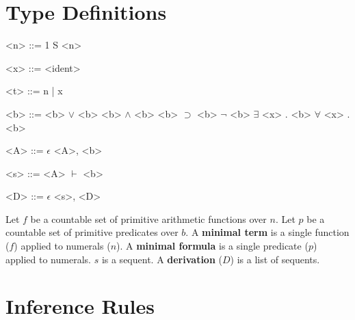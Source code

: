 \documentclass[11pt]{article}
\begin{document}
\section{Type Definitions}

\begin{grammar}
  <n> ::= 1
    \alt S <n>

  <x> ::= <ident>

  <t> ::= n | x

  <b> ::= <b> \(\vee\) <b>
    \alt <b> \(\wedge\) <b>
    \alt <b> \(\supset\) <b>
    \alt \(\neg\) <b>
    \alt \(\exists\) <x> . <b>
    \alt \(\forall\) <x> . <b>

  <A> ::= \(\epsilon\)
    \alt <A>, <b>

  <s> ::= <A> \(\vdash\) <b>

  <D> ::= \(\epsilon\)
    \alt <s>, <D>
\end{grammar}

Let $f$ be a countable set of primitive arithmetic functions over
$n$. Let $p$ be a countable set of primitive predicates over $b$.  A
\textbf{minimal term} is a single function ($f$) applied to numerals
($n$). A \textbf{minimal formula} is a single predicate ($p$) applied
to numerals. $s$ is a sequent. A \textbf{derivation} ($D$) is a
list of sequents.

\section{Inference Rules}

\begin{prooftree}


\end{prooftree}

\begin{prooftree}


\end{prooftree}

\begin{prooftree}


\end{prooftree}

\begin{prooftree}


\end{prooftree}
\end{document}
